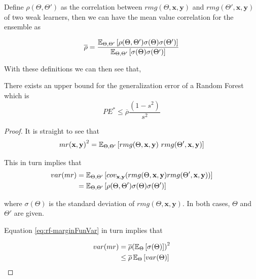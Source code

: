 \begin{appendices}
Define $ \rho(\Theta, \Theta')$ as the correlation between $rmg(\Theta,\textbf{x},\textbf{y})$ and $rmg(\Theta',\textbf{x},\textbf{y})$ of two weak learners, then we can have the mean value correlation for the ensemble as

\begin{equation}\label{eq:rf-meanCorrelation}
\overline{\rho} = \frac{\operatorname{\mathbb{E}}_{\Theta, \Theta'} \left[ \rho(\Theta, \Theta') \sigma(\Theta) \sigma(\Theta')\right]}
{\operatorname{\mathbb{E}}_{\Theta, \Theta'} \left[ \sigma(\Theta) \sigma(\Theta')\right]}
\end{equation}

With these definitions we can then see that,

\begin{theorem}
	There exists an upper bound for the generalization error of a Random Forest which is    \begin{equation}\label{eq:rf-PEBound}
	PE^* \leq \overline{\rho}\frac{(1-s^2)}{s^2}
	\end{equation}
\end{theorem}


\begin{proof}


	It is straight to see that
	\begin{equation}
	{mr( \textbf{x},\textbf{y} )}^2 = \Expect_{\Theta, \Theta'} \left[ rmg( \Theta,\textbf{x},\textbf{y} ) \ rmg(\Theta',\textbf{x},\textbf{y} ) \right]
	\end{equation}


	This in turn implies that
	\begin{equation}\label{eq:rf-marginFunVar}
	\begin{split}
	var(mr) & = \operatorname{\mathbb{E}}_{\Theta, \Theta'}
	\left[
	cov_{\textbf{x},\textbf{y}}
	(rmg(\Theta,\textbf{x},\textbf{y} )rmg(\Theta',\textbf{x},\textbf{y} ))
	\right] \\
	& = \operatorname{\mathbb{E}}_{\Theta, \Theta'}
	\left[
	\rho(\Theta, \Theta')\sigma(\Theta)\sigma(\Theta')
	\right]
	\end{split}
	\end{equation}

	where $\sigma(\Theta)$ is the standard deviation of $rmg(\Theta,\textbf{x},\textbf{y})$.
	In both cases, $\Theta$ and $\Theta'$ are given.%

	Equation \cref{eq:rf-marginFunVar} in turn implies that

	\begin{equation}\label{eq:rf-varianceBound}
	\begin{split}
	var(mr) & = \overline{\rho} {(\operatorname{\mathbb{E}}_{\Theta}\left[ \sigma(\Theta)\right] )}^2 \\
	& \leq \overline{\rho} \operatorname{\mathbb{E}}_{\Theta} \left[ var(\Theta) \right]
	\end{split}
	\end{equation}



\end{proof}
\end{appendices}

